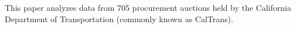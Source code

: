 This paper analyzes data from 705 procurement auctions held
by the California Department of Transportation (commonly
known as CalTrans).
